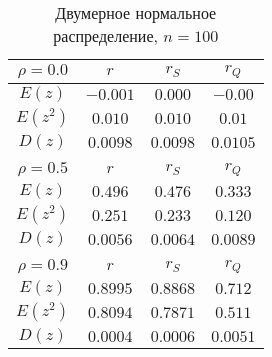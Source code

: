 \documentclass[12pt,a4paper]{article}
\begin{document}
\begin{center}
		\begin{table}[H]
			\begin{center}
				\begin{tabular}{|c|c|c|c|}
					\hline
					$\rho=0.0$ & $r$ & $r_S$ & $r_Q$\\
					\hline
					$E(z)$ & $-0.001$ & $0.000$ & $-0.00$ \\
					\hline
					$E(z^2)$ & $0.010$ & $0.010$ & $0.01$ \\
					\hline
					$D(z)$ & $0.0098$ & $0.0098$ & $0.0105$ \\
					\hline
					\multicolumn{4}{c}{ } \\
					\hline
					$\rho=0.5$ & $r$ & $r_S$ & $r_Q$\\
					\hline
					$E(z)$ & $0.496$ & $0.476$ & $0.333$ \\
					\hline
					$E(z^2)$ & $0.251$ & $0.233$ & $0.120$ \\
					\hline
					$D(z)$ & $0.0056$ & $0.0064$ & $0.0089$ \\
					\hline
					\multicolumn{4}{c}{ } \\
					\hline
					$\rho=0.9$ & $r$ & $r_S$ & $r_Q$\\
					\hline
					$E(z)$ & $0.8995$ & $0.8868$ & $0.712$ \\
					\hline
					$E(z^2)$ & $0.8094$ & $0.7871$ & $0.511$ \\
					\hline
					$D(z)$ & $0.0004$ & $0.0006$ & $0.0051$ \\
					\hline					
				\end{tabular}
				\caption{Двумерное нормальное распределение, $n = 100$}
			\end{center}
		\end{table}
		

\end{center}
\end{document}
